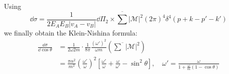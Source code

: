 Using 
\[
\dd\sigma =\frac{1}{2E_AE_B|v_A-v_B|}\dd \Pi_2 \times \overline{\sum}|\mathcal M|^2 (2\pi)^4 \delta^4(p+k-p'-k')
\]
we finally obtain the Klein-Nishina formula:
\begin{equation}\begin{aligned}
\frac{\dd \sigma}{\dd \cos\theta} &= \frac{1}{2\omega 2m}\cdot \frac{1}{8\pi} \frac{(\omega')^2}{\omega m }
\left(\overline{\sum}|\mathcal M|^2\right)\\
&=\frac{\pi \alpha^2}{m^2}\left(\frac{\omega'}{\omega}\right)^2\left[\frac{\omega'}{\omega}+\frac{\omega}{\omega'}-\sin^2\theta\right],\quad \omega'=\frac{\omega}{1+\frac{\omega}{m}(1-\cos\theta)}
\end{aligned}\end{equation}